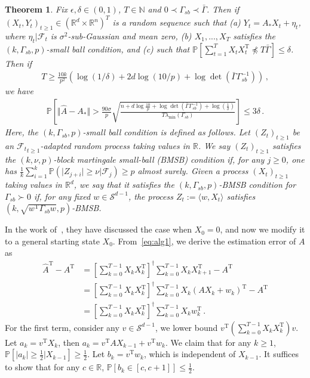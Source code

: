 \documentclass{article}
\newtheorem{theorem}{Theorem}
\theoremstyle{definition}
\begin{document}
\begin{theorem}\label{thm:simchowitz}
Fix $\epsilon,\delta\in(0,1)$, $T\in\mathbb{N}$ and $0\prec \Gamma_{sb}\prec\bar{\Gamma}$. Then if $(X_{t},Y_{t})_{t\geq1}\in (\mathbb{R}^{d}\times\mathbb{R}^{n})^{T}$ is a random sequence such that (a) $Y_{t}=A_{*}X_{t}+\eta_{t}$, where $\eta_{t}\vert \mathcal{F}_{t}$ is $\sigma^{2}$-sub-Gaussian and mean zero, (b) $X_{1},...,X_{T}$ satisfies the $(k,\Gamma_{sb},p)$-small ball condition, and (c) such that $\mathbb{P}\left[\sum_{t=1}^{T}X_{t}X^{\mathrm{T}}_{t}\not\preceq T\bar{\Gamma}\right]\leq \delta$. Then if
\begin{align*}
T\geq\frac{10k}{p^{2}}\left(\log(1/\delta)+2d\log(10/p)+\log \det(\bar{\Gamma}\Gamma^{-1}_{sb})\right)\,,
\end{align*}
we have
\begin{align*}
\mathbb{P}\left[\Vert \hat{A}-A_{*}\Vert >\frac{90\sigma}{p}\sqrt{\frac{n+d\log\frac{10}{p}+\log \det(\bar{\Gamma}\Gamma^{-1}_{sb})+\log(\frac{1}{\delta})}{T\lambda_{\min}(\Gamma_{sb})}}\right]\leq 3\delta\,.
\end{align*}
Here, the $(k,\Gamma_{sb},p)$-small ball condition is defined as follows. Let $(Z_{t})_{t\geq1}$ be an ${\mathcal{F}_{t}}_{t\geq1}$-adapted random process taking values in $\mathbb{R}$. We say $(Z_{t})_{t\geq1}$ satisfies the $(k,\nu,p)$-block martingale small-ball (BMSB) condition if, for any $j\geq0$, one has $\frac{1}{k}\sum_{i=1}^{k}\mathbb{P}(\vert Z_{j+i}\vert \geq\nu \vert \mathcal{F}_{j})\geq p$ almost surely. Given a process $(X_{t})_{t\geq1}$ taking values in $\mathbb{R}^{d}$, we say that it satisfies the $(k,\Gamma_{sb},p)$-BMSB condition for $\Gamma_{sb}\succ 0$ if, for any fixed $w\in\mathcal{S}^{d-1}$, the process $Z_{t}:=\langle w,X_{t}\rangle$ satisfies $(k,\sqrt{w^{\mathrm{T}}\Gamma_{sb}w},p)$-BMSB.
\end{theorem}

In the work of~\citep{ref4}, they have discussed the case when $X_{0}=0$, and now we modify it to a general starting state $X_{0}$.
From~\eqref{eq:alg1}, we derive the estimation error of $A$ as
\begin{align*}
\hat{A}^{\mathrm{T}}-A^{\mathrm{T}}&=\left[\sum_{k=0}^{T-1}X_{k}X^{\mathrm{T}}_{k}\right]^{\dagger}\sum_{k=0}^{T-1}X_{k}X^{\mathrm{T}}_{k+1}-A^{\mathrm{T}}\\
&=\left[\sum_{k=0}^{T-1}X_{k}X^{\mathrm{T}}_{k}\right]^{\dagger}\sum_{k=0}^{T-1}X_{k}(AX_{k}+w_{k})^{\mathrm{T}}-A^{\mathrm{T}}\\
&=\left[\sum_{k=0}^{T-1}X_{k}X^{\mathrm{T}}_{k}\right]^{\dagger}\sum_{k=0}^{T-1}X_{k}w^{\mathrm{T}}_{k}\,.
\end{align*}
For the first term, consider any $v\in\mathcal{S}^{d-1}$, we lower bound $v^{\mathrm{T}}\left(\sum_{k=0}^{T-1}X_{k}X^{\mathrm{T}}_{k}\right)v$.
Let $a_{k}=v^{\mathrm{T}}X_{k}$, then  $a_{k}=v^{\mathrm{T}}AX_{k-1}+v^{\mathrm{T}}w_{k}$.
We claim that for any $k\geq 1$, $\mathbb{P}\left[\vert a_{k}\vert \geq \frac{1}{2}\vert X_{k-1}\right]\geq\frac{1}{2}$.
Let $b_{k}=v^{\mathrm{T}}w_{k}$, which is independent of $X_{k-1}$. It suffices to show that for any $c\in\mathbb{R}$, $\mathbb{P}\left[b_{k}\in [c,c+1]\right]\leq \frac{1}{2}$.
\end{document}
